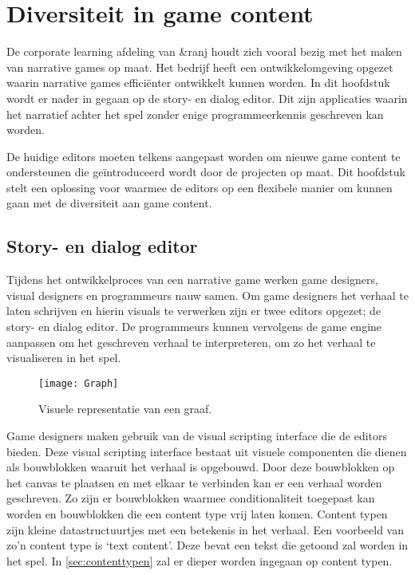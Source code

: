 \chapter{Diversiteit in game content}
\label{ch:diversiteitingamecontent}
De corporate learning afdeling van \&ranj houdt zich vooral bezig met het maken van narrative games op maat. Het bedrijf heeft een ontwikkelomgeving opgezet waarin narrative games efficiënter ontwikkelt kunnen worden. In dit hoofdstuk wordt er nader in gegaan op de story- en dialog editor. Dit zijn applicaties waarin het narratief achter het spel zonder enige programmeerkennis geschreven kan worden. 

De huidige editors moeten telkens aangepast worden om nieuwe game content te ondersteunen die geïntroduceerd wordt door de projecten op maat. Dit hoofdstuk stelt een oplossing voor waarmee de editors op een flexibele manier om kunnen gaan met de diversiteit aan game content.

\section{Story- en dialog editor}
Tijdens het ontwikkelproces van een narrative game werken game designers, visual designers en programmeurs nauw samen. Om game designers het verhaal te laten schrijven en hierin visuals te verwerken zijn er twee editors opgezet; de story- en dialog editor. De programmeurs kunnen vervolgens de game engine aanpassen om het geschreven verhaal te interpreteren, om zo het verhaal te visualiseren in het spel.

\begin{wrapfigure}{r}{0.35\textwidth}
    \texttt{[image: Graph]}
    \caption{Visuele representatie van een graaf.}
    \label{fig:graph}
    \centering
\end{wrapfigure}

Game designers maken gebruik van de visual scripting interface die de editors bieden. Deze visual scripting interface bestaat uit visuele componenten die dienen als bouwblokken waaruit het verhaal is opgebouwd. Door deze bouwblokken op het canvas te plaatsen en met elkaar te verbinden kan er een verhaal worden geschreven. Zo zijn er bouwblokken waarmee conditionaliteit toegepast kan worden en bouwblokken die een content type vrij laten komen. Content typen zijn kleine datastructuurtjes met een betekenis in het verhaal. Een voorbeeld van zo’n content type is ‘text content’. Deze bevat een tekst die getoond zal worden in het spel. In \autoref{sec:contenttypen} zal er dieper worden ingegaan op content typen.

